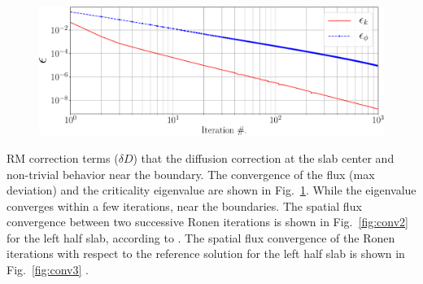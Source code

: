 \begin{figure}[htbp]
	\centering
	\includegraphics[width=0.65\linewidth]{epsilon1000.pdf}	
	\caption{}
	\label{fig:conv}
\end{figure}

\DIFaddend RM correction terms ($\delta D$) \DIFdelbegin {}\DIFdelend \DIFaddbegin {}\DIFaddend that the diffusion correction \DIFdelbegin {}\DIFdelend \DIFaddbegin {}\DIFaddend at the slab center and \DIFdelbegin {}\DIFdelend \DIFaddbegin {}\DIFaddend non-trivial behavior near the boundary. The convergence of the flux (max deviation) and \DIFaddbegin {}\DIFaddend the criticality eigenvalue are shown in Fig.~\ref{fig:conv}\DIFaddbegin {}\DIFaddend . While the eigenvalue converges within a few iterations, \DIFdelbegin {}\DIFdelend \DIFaddbegin {}\DIFaddend near the boundaries. The spatial flux convergence between two successive Ronen iterations is shown in Fig.~\ref{fig:conv2} for the left half slab, according to \DIFdelbegin {}\DIFdelend \DIFaddbegin {}\DIFaddend [\%]. The spatial flux convergence of the Ronen iterations with respect to the reference \DIFdelbegin {}\DIFdelend solution for the left half slab is shown in Fig.~\ref{fig:conv3} \DIFaddbegin {}\DIFaddend .

